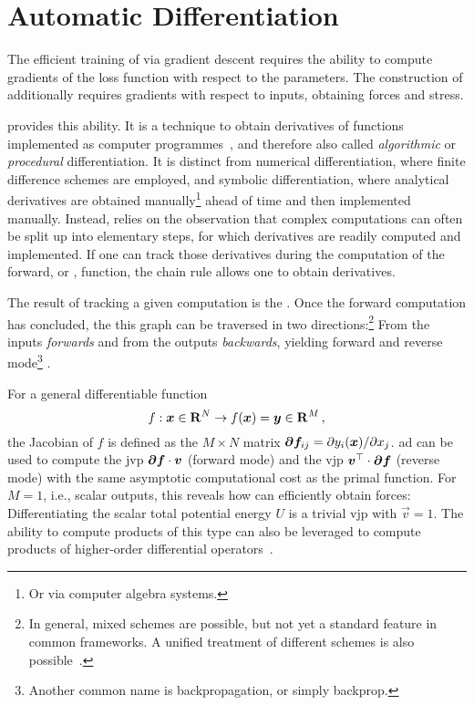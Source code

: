 \section{Automatic Differentiation}
\label{sec:ml-ad}

The efficient training of \nns via gradient descent requires the ability to compute gradients of the loss function with respect to the parameters. The construction of \mlps additionally requires gradients with respect to inputs, obtaining forces and stress.

 provides this ability. It is a technique to obtain derivatives of functions implemented as computer programmes~\cite{rhw1986m,griewank2008,bprs2017m}, and therefore also called \emph{algorithmic} or \emph{procedural} differentiation.
It is distinct from numerical differentiation, where finite difference schemes are employed, and symbolic differentiation, where analytical derivatives are obtained manually\footnote{Or via computer algebra systems.} ahead of time and then implemented manually.
Instead, \ad relies on the observation that complex computations can often be split up into elementary steps, for which derivatives are readily computed and implemented. If one can track those derivatives during the computation of the forward, or , function, the chain rule allows one to obtain derivatives.

The result of tracking a given computation is the . Once the forward computation has concluded, the this graph can be traversed in two directions:\footnote{In general, mixed schemes are possible, but not yet a standard feature in common \ad frameworks. A unified treatment of different schemes is also possible~\cite{rpjm2022m}.} From the inputs \emph{forwards} and from the outputs \emph{backwards}, yielding forward and reverse mode\footnote{Another common name is backpropagation, or simply backprop.} \ad.

For a general differentiable function
\begin{equation}
	f: \boldsymbol{x} \in {\bf R}^N \rightarrow f(\boldsymbol{x}) = \boldsymbol{y} \in {\bf R}^M \,,
\end{equation}
the Jacobian of $f$ is defined as the $M \times N$ matrix $\boldsymbol{\partial f}_{ij} = \partial y_i(\boldsymbol{x})/\partial x_j$. 
\Gls{ad} can be used to compute the \gls{jvp} $\boldsymbol{\partial f} \cdot \boldsymbol{v}$ (forward mode) and the \gls{vjp} $\boldsymbol{v}^\top \cdot \boldsymbol{\partial f}$ (reverse mode) with the same asymptotic computational cost as the primal function.
For $M{=}1$, i.e., scalar outputs, this reveals how \mlps can efficiently obtain forces: Differentiating the scalar total potential energy $U$ is a trivial \gls{vjp} with $\vec{v}{=}1$.
The ability to compute products of this type can also be leveraged to compute products of higher-order differential operators~\cite{smc2022q}.

